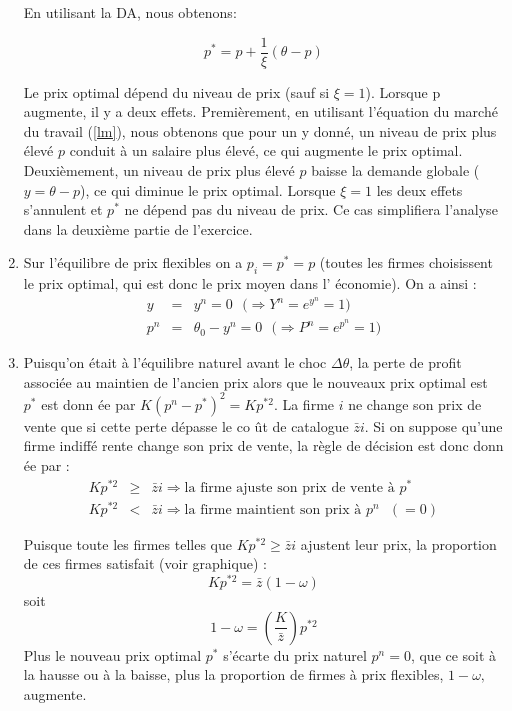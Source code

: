 \documentclass[11pt,a4paper]{article}
\begin{document}
\begin{enumerate}
En utilisant la DA, nous obtenons:

\begin{equation}\label{price}
p^{\ast }=p+\frac{1}{\xi } (\theta -p)
\end{equation}%



Le prix optimal dépend du niveau de prix (sauf si $\xi=1$). Lorsque p augmente, il y a deux effets. Premièrement, en utilisant l'équation du marché du travail (\ref{lm}), nous obtenons que pour un y donné, un niveau de prix plus élevé $p$ conduit à un salaire plus élevé, ce qui augmente le prix optimal. Deuxièmement, un niveau de prix plus élevé $p$ baisse la demande globale ($y=\theta-p $), ce qui diminue le prix optimal. Lorsque $\xi = 1 $ les deux effets s'annulent et $ p^{\ast}$ ne dépend pas du niveau de prix. Ce cas simplifiera l'analyse dans la deuxième partie de l'exercice.

\item Sur l'\'{e}quilibre de prix flexibles on a $p_{i}=p^{\ast }=p$ (toutes
les firmes choisissent le prix optimal, qui est donc le prix moyen dans l'%
\'{e}conomie). On a ainsi :%
\begin{eqnarray*}
y &=&y^{n}=0\text{ }(\Rightarrow Y^{n}=e^{y^{n}}=1\text{)} \\
p^{n} &=&\theta_{0}-y^{n}=0\text{ }(\Rightarrow P^{n}=e^{p^{n}}=1\text{)}
\end{eqnarray*}

\item Puisqu'on \'{e}tait \`{a} l'\'{e}quilibre naturel avant le choc $%
\Delta \theta$, la perte de profit associ\'{e}e au maintien de
l'ancien prix alors que le nouveaux prix optimal est $p^{\ast }$ est donn%
\'{e}e par $K\left( p^{n}-p^{\ast }\right) ^{2}=Kp^{\ast 2}$. 
La firme $i$ ne change son prix de vente que si cette perte d\'{e}passe le co%
\^{u}t de catalogue $\bar{z}i $. Si on suppose qu'une firme indiff\'{e}%
rente change son prix de vente, la r\`{e}gle de d\'{e}cision est donc donn%
\'{e}e par :%
\begin{eqnarray*}
Kp^{\ast 2} &\geq &\bar{z}i\Rightarrow \text{la firme ajuste son prix de
vente \`{a} }p^{\ast } \\
Kp^{\ast 2} &<&\bar{z}i\Rightarrow \text{la firme maintient son prix \`{a} }%
p^{n}\text{ }(=0)
\end{eqnarray*}

Puisque toute les firmes telles que $Kp^{\ast 2}\geq \bar{z}i$ ajustent leur
prix, la proportion de ces firmes satisfait (voir graphique) :%
\begin{equation*}
Kp^{\ast 2}=\bar{z}\left( 1-\omega \right)
\end{equation*}%
soit%
\begin{equation}\label{ome}
1-\omega =\left( \frac{K}{\bar{z}}\right) p^{\ast 2}
\end{equation}%
Plus le nouveau prix optimal $p^{\ast }$ s'\'{e}carte du prix naturel $%
p^{n}=0$, que ce soit \`{a} la hausse ou \`{a} la baisse, plus la proportion
de firmes \`{a} prix flexibles, $1-\omega ,$ augmente.  


\end{enumerate}
\end{document}
